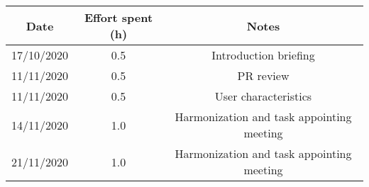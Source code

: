 \documentclass[../../main.tex]{subfiles}
\begin{document}
\begin{center}
    \begin{tabular}{|c| |c| |c|} 
        \hline
        Date & Effort spent (h) & Notes\\ [0.5ex] 
        \hline\hline
        17/10/2020 & 0.5 & Introduction briefing\\ 
        11/11/2020 & 0.5 & PR review\\
        11/11/2020 & 0.5 & User characteristics\\
        14/11/2020 & 1.0 & Harmonization and task appointing meeting\\
        21/11/2020 & 1.0 & Harmonization and task appointing meeting\\
        \hline
    \end{tabular}
\end{center}
\end{document}
